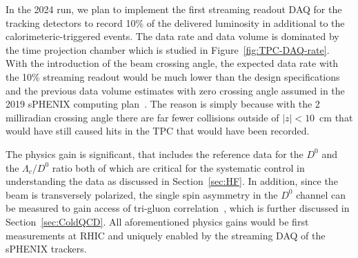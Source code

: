 In the 2024 run, we plan to implement the first streaming readout DAQ for the tracking detectors to record 10\% of the delivered luminosity in additional to the calorimeteric-triggered events. The data rate and data volume is dominated by the time projection chamber which is studied in Figure~\ref{fig:TPC-DAQ-rate}. With the introduction of the beam crossing angle, the expected data rate with the 10\% streaming readout would be much lower than the design specifications and the previous data volume estimates with zero crossing angle assumed in the 2019 sPHENIX computing plan~\cite{sPH-COMP-2019-001}. The reason is simply because with the 2 milliradian crossing angle there are far fewer collisions outside of $|z|<10$~cm that would have still caused hits in the TPC that would have been recorded.

The physics gain is significant, that includes the \pp reference data for the $D^0$ \raa and the $\Lambda_c/D^0$ ratio both of which are critical for the systematic control in understanding the \AuAu data as discussed in Section~\ref{sec:HF}. In addition, since the \pp beam is transversely polarized, the single spin asymmetry in the $D^0$ channel can be measured to gain access of tri-gluon correlation~\cite{Kang:2008ih, Koike:2011mb}, which is further discussed in Section~\ref{sec:ColdQCD}. 
All aforementioned physics gains would be first measurements at RHIC and uniquely enabled by the streaming DAQ of the sPHENIX trackers.


 

